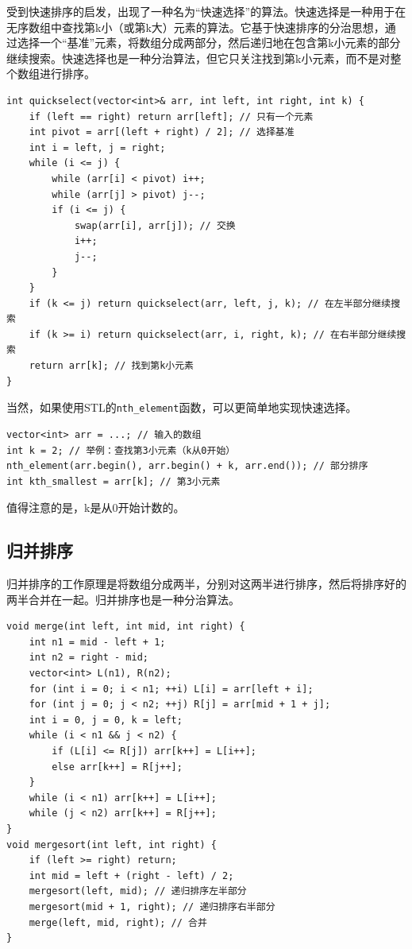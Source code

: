\documentclass{article}
\begin{document}
受到快速排序的启发，出现了一种名为“快速选择”的算法。快速选择是一种用于在无序数组中查找第k小（或第k大）元素的算法。它基于快速排序的分治思想，通过选择一个“基准”元素，将数组分成两部分，然后递归地在包含第k小元素的部分继续搜索。快速选择也是一种分治算法，但它只关注找到第k小元素，而不是对整个数组进行排序。

\begin{lstlisting}
int quickselect(vector<int>& arr, int left, int right, int k) {
    if (left == right) return arr[left]; // 只有一个元素
    int pivot = arr[(left + right) / 2]; // 选择基准
    int i = left, j = right;
    while (i <= j) {
        while (arr[i] < pivot) i++;
        while (arr[j] > pivot) j--;
        if (i <= j) {
            swap(arr[i], arr[j]); // 交换
            i++;
            j--;
        }
    }
    if (k <= j) return quickselect(arr, left, j, k); // 在左半部分继续搜索
    if (k >= i) return quickselect(arr, i, right, k); // 在右半部分继续搜索
    return arr[k]; // 找到第k小元素
}
\end{lstlisting}

当然，如果使用STL的\texttt{nth\_element}函数，可以更简单地实现快速选择。
\begin{lstlisting}
vector<int> arr = ...; // 输入的数组
int k = 2; // 举例：查找第3小元素（k从0开始）
nth_element(arr.begin(), arr.begin() + k, arr.end()); // 部分排序
int kth_smallest = arr[k]; // 第3小元素
\end{lstlisting}
值得注意的是，k是从0开始计数的。

\subsection{归并排序}

归并排序的工作原理是将数组分成两半，分别对这两半进行排序，然后将排序好的两半合并在一起。归并排序也是一种分治算法。

\begin{lstlisting}
void merge(int left, int mid, int right) {
    int n1 = mid - left + 1;
    int n2 = right - mid;
    vector<int> L(n1), R(n2);
    for (int i = 0; i < n1; ++i) L[i] = arr[left + i];
    for (int j = 0; j < n2; ++j) R[j] = arr[mid + 1 + j];
    int i = 0, j = 0, k = left;
    while (i < n1 && j < n2) {
        if (L[i] <= R[j]) arr[k++] = L[i++];
        else arr[k++] = R[j++];
    }
    while (i < n1) arr[k++] = L[i++];
    while (j < n2) arr[k++] = R[j++];
}
void mergesort(int left, int right) {
    if (left >= right) return;
    int mid = left + (right - left) / 2;
    mergesort(left, mid); // 递归排序左半部分
    mergesort(mid + 1, right); // 递归排序右半部分
    merge(left, mid, right); // 合并
}
\end{lstlisting}
\end{document}
